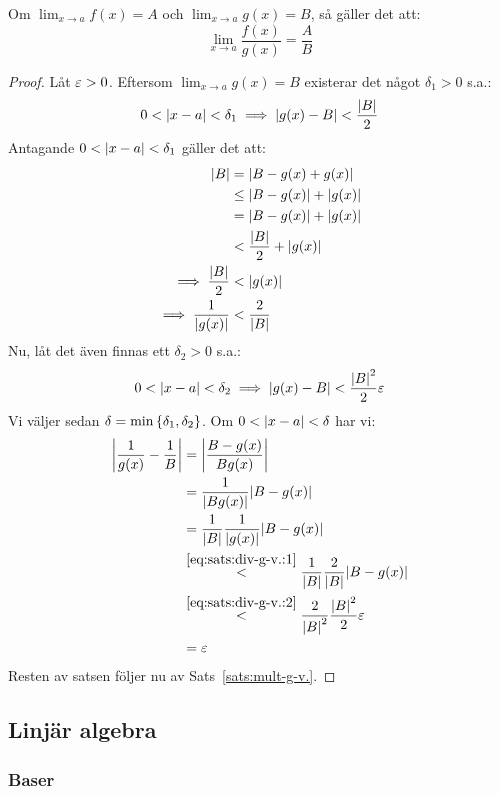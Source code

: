 \begin{theorem}
	Om $\lim_{x\to a}f(x)=A$ och $\lim_{x\to a}g(x)=B$, så gäller det att:
	$$
		\lim_{x\to a}\frac{f(x)}{g(x)}=\frac{A}{B}
	$$
	
	\begin{proof}
		Låt $\varepsilon>0$. Eftersom $\lim_{x\to a}g(x)=B$ existerar det något $\delta_1>0$
		s.a.:
		$$
			0<\qty|x-a|<\delta_1\implies\qty|g(x)-B|<\frac{\qty|B|}{2}
		$$
		Antagande $0<\qty|x-a|<\delta_1$ gäller det att:
		\begin{align}
			\notag\qty|B|
			\notag&=\qty|B-g(x)+g(x)|\\
			\notag&\leq\qty|B-g(x)|+\qty|g(x)|\\
			\notag&=\qty|B-g(x)|+\qty|g(x)|\\
			\notag&<\frac{\qty|B|}{2}+\qty|g(x)|\\
			\notag\implies\frac{\qty|B|}{2}&<\qty|g(x)|\\
			\label{eq:sats:div-g-v.:1}\implies\frac{1}{\qty|g(x)|}&<\frac{2}{\qty|B|}
		\end{align}
		Nu, låt det även finnas ett $\delta_2>0$ s.a.:
		\begin{equation}
			\label{eq:sats:div-g-v.:2}0<\qty|x-a|<\delta_2\implies\qty|g(x)-B|<\frac{\qty|B|^2}{2}\varepsilon
		\end{equation}
		Vi väljer sedan $\delta=\min\qty{\delta_1,\delta_2}$. Om $0<\qty|x-a|<\delta$
		har vi:
		\begin{align*}
			\qty|\frac{1}{g(x)}-\frac{1}{B}|
			&=\qty|\frac{B-g(x)}{Bg(x)}|\\
			&=\frac{1}{\qty|Bg(x)|}\qty|B-g(x)|\\
			&=\frac{1}{\qty|B|}\frac{1}{\qty|g(x)|}\qty|B-g(x)|\\
			&\stackrel{\eqref{eq:sats:div-g-v.:1}}{<}\frac{1}{\qty|B|}\frac{2}{\qty|B|}\qty|B-g(x)|\\
			&\stackrel{\eqref{eq:sats:div-g-v.:2}}{<}\frac{2}{\qty|B|^2}\frac{\qty|B|^2}{2}\varepsilon\\
			&=\varepsilon
		\end{align*}
		Resten av satsen följer nu av Sats~\ref{sats:mult-g-v.}.
	\end{proof}
\end{theorem}

\subsection{Linjär algebra}

\subsubsection{Baser}


